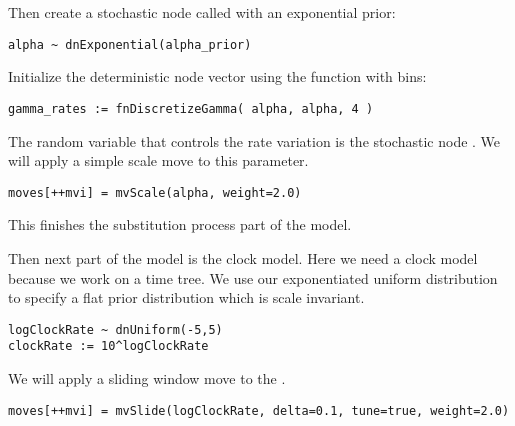 Then create a stochastic node called  with an exponential prior:
{\tt\begin{snugshade*}
\begin{lstlisting}
alpha ~ dnExponential(alpha_prior)
\end{lstlisting}
\end{snugshade*}}
Initialize the  deterministic node vector using the   function with  bins:
{\tt \begin{snugshade*}
\begin{lstlisting}
gamma_rates := fnDiscretizeGamma( alpha, alpha, 4 )
\end{lstlisting}
\end{snugshade*}}
The random variable that controls the rate variation is the stochastic node . 
We will apply a simple scale move to this parameter.
{\tt \begin{snugshade*}
\begin{lstlisting}
moves[++mvi] = mvScale(alpha, weight=2.0)
\end{lstlisting}
\end{snugshade*}}
This finishes the substitution process part of the model.

Then next part of the model is the clock model. Here we need a clock model because we work on a time tree. We use our exponentiated uniform distribution to specify a flat prior distribution which is scale invariant.
{\tt \begin{snugshade*}
\begin{lstlisting}
logClockRate ~ dnUniform(-5,5)
clockRate := 10^logClockRate
\end{lstlisting}
\end{snugshade*}}
We will apply a sliding window move to the .
{\tt \begin{snugshade*}
\begin{lstlisting}
moves[++mvi] = mvSlide(logClockRate, delta=0.1, tune=true, weight=2.0)
\end{lstlisting}
\end{snugshade*}}

